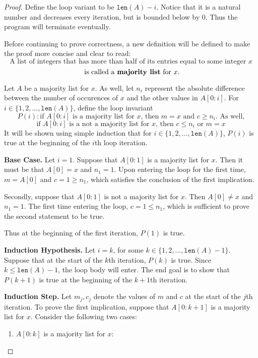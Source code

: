 \documentclass[11pt]{article}
\begin{document}
    \begin{proof}
        Define the loop variant to be \(\texttt{len}(A) - i\). Notice that it is a natural number and decreases every iteration, but is bounded below by 0. Thus the program will terminate eventually.

        Before continuing to prove correctness, a new definition will be defined to make the proof more concise and clear to read:
        \[
            \text{A list of integers that has more than half of its entries equal to some integer } x
        \]
        \[
            \text{ is called a \textbf{majority list} for } x \text{.}
        \]

        Let \(A\) be a majority list for \(x\). As well, let \(n_i\) represent the absolute difference between the number of occurences of \(x\) and the other values in \(A[0:i]\). For \(i \in \{1,2,...,\texttt{len}(A)\}\), define the loop invariant
        \[
            P(i) : \text{if } A[0:i] \text{ is a majority list for } x \text{, then } m=x \text{ and } c \geq n_i \text{. As well,}
        \]
        \[
            \text{if } A[0:i] \text{ is a not a majority list for } x \text{, then } c\leq n_i \text{ or } m=x
        \]
        It will be shown using simple induction that for \(i \in \{1,2,...,\texttt{len}(A)\}\), \(P(i)\) is true at the beginning of the \(i\)th loop iteration.

        \textbf{Base Case.} Let \(i = 1\). Suppose that \(A[0:1]\) is a majority list for \(x\). Then it must be that \(A[0]=x\) and \(n_1=1\). Upon entering the loop for the first time, \(m=A[0]\) and \(c=1\geq n_1\), which satisfies the conclusion of the first implication.
        
        Secondly, suppose that \(A[0:1]\) is not a majority list for \(x\). Then \(A[0]\neq x\) and \(n_1=1\). The first time entering the loop, \(c=1\leq n_1\), which is sufficient to prove the second statement to be true.

        Thus at the beginning of the first iteration, \(P(1)\) is true.

        \textbf{Induction Hypothesis.} Let \(i=k\), for some \(k \in \{1,2,...,\texttt{len}(A) -1\}\). Suppose that at the start of the \(k\)th iteration, \(P(k)\) is true. Since \(k \leq \texttt{len}(A) -1\), the loop body will enter. The end goal is to show that \(P(k+1)\) is true at the beginning of the \(k+1\)th iteration.

        \textbf{Induction Step.} Let \(m_j, c_j\) denote the values of \(m\) and \(c\) at the start of the \(j\)th iteration. To prove the first implication, suppose that \(A[0:k+1]\) is a majority list for \(x\). Consider the following two cases:
        \begin{enumerate}
            \item \(A[0:k]\) is a majority list for \(x\):
            

\end{enumerate}
\end{proof}
\end{document}

